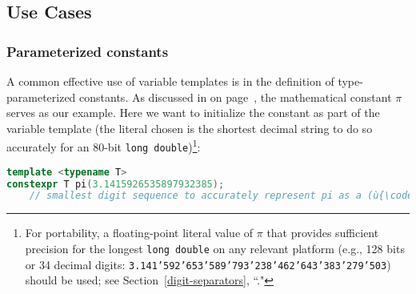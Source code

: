 \subsection[Use Cases]{Use Cases}\label{variabletemplate-use-cases}

\subsubsection[Parameterized constants]{Parameterized constants}\label{parametrized-constants}

A common effective use of variable templates is in the definition of
type-parameterized constants. As discussed in {\it{}} on page~\pageref{variabletemplate-description}, the mathematical
constant $\pi$ serves as our example. Here we want to
initialize the constant as part of the variable template (the literal
chosen is the shortest decimal string to do so accurately for an 80-bit
\texttt{long}~\texttt{double}){\cprotect\footnote{For
portability, a floating-point literal value of \(\pi\) that provides
sufficient precision for the longest \texttt{long}~\texttt{double} on
any relevant platform (e.g., 128 bits or 34 decimal digits:
\texttt{3.141'592'653'589'793'238'462'643'383'279'503}) should be
  used; see Section~\ref{digit-separators}, ``."}}:

\begin{lstlisting}[language=C++]
template <typename T>
constexpr T pi(3.1415926535897932385);
    // smallest digit sequence to accurately represent pi as a (ù{\codeincomments{long double}}ù)
\end{lstlisting}
    

